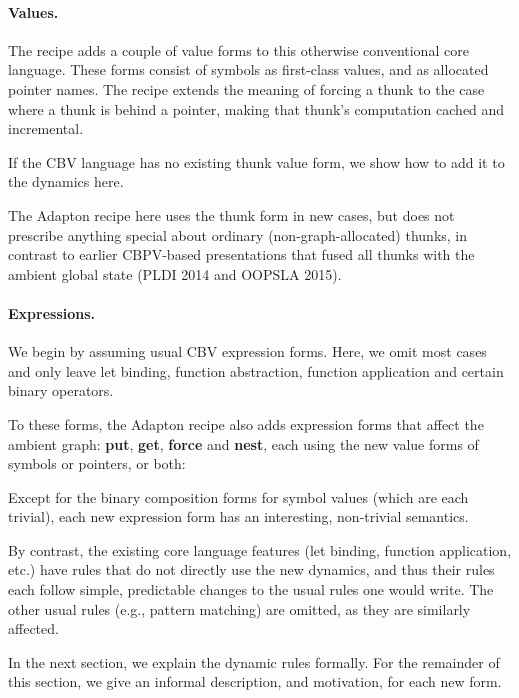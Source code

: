 \documentclass[11pt]{article}
\begin{document}
\paragraph{Values.}

The recipe adds a couple of value forms to this otherwise conventional core language.
%
These forms consist of symbols as first-class values, and as allocated
pointer names.
%
The recipe extends the meaning of forcing a thunk to the case where a
thunk is behind a pointer, making that thunk's computation cached and
incremental.

\ottgrammartabular{
  \ottv
}


If the CBV language has no existing thunk value form, we show how to
add it to the dynamics here.

The Adapton recipe here uses the thunk form in new cases, but does not
prescribe anything special about ordinary (non-graph-allocated)
thunks, in contrast to earlier CBPV-based presentations that fused all
thunks with the ambient global state (PLDI 2014 and OOPSLA 2015).

\paragraph{Expressions.}

We begin by assuming usual CBV expression forms.  Here, we omit most
cases and only leave let binding, function abstraction, function
application and certain binary operators.

To these forms, the Adapton recipe also adds expression forms that
affect the ambient graph: \textbf{put}, \textbf{get}, \textbf{force}
and \textbf{nest}, each using the new value forms of symbols or
pointers, or both:

\ottgrammartabular{
  \otte
}

Except for the binary composition forms for symbol values (which are
each trivial), each new expression form has an interesting,
non-trivial semantics.

By contrast, the existing core language features (let binding,
function application, etc.) have rules that do not directly use the
new dynamics, and thus their rules each follow simple, predictable
changes to the usual rules one would write.
%
The other usual rules (e.g., pattern matching) are omitted, as they
are similarly affected.

In the next section, we explain the dynamic rules formally.
%
For the remainder of this section, we give an informal description,
and motivation, for each new form.
\end{document}

